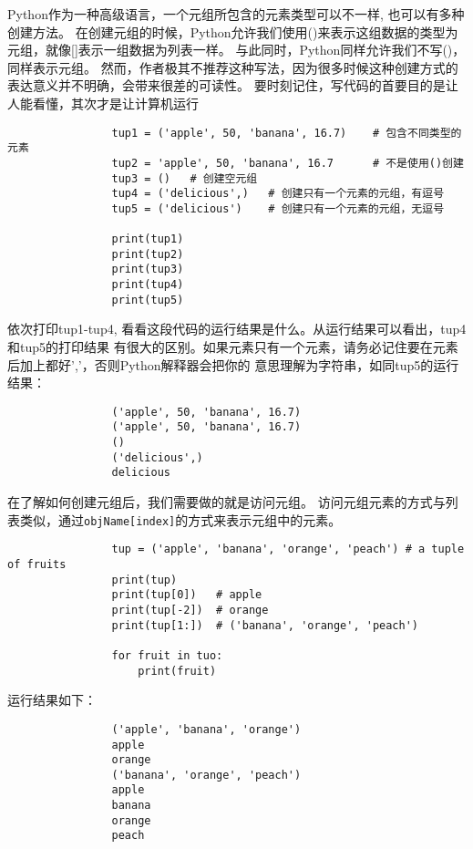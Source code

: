\documentclass[12pt]{article}
\begin{document}
            Python作为一种高级语言，一个元组所包含的元素类型可以不一样, 也可以有多种创建方法。
            在创建元组的时候，Python允许我们使用()来表示这组数据的类型为元组，就像[]表示一组数据为列表一样。
            与此同时，Python同样允许我们不写()，同样表示元组。
            然而，作者极其不推荐这种写法，因为很多时候这种创建方式的表达意义并不明确，会带来很差的可读性。
            要时刻记住，写代码的首要目的是让人能看懂，其次才是让计算机运行
            \begin{lstlisting}
                tup1 = ('apple', 50, 'banana', 16.7)    # 包含不同类型的元素
                tup2 = 'apple', 50, 'banana', 16.7      # 不是使用()创建
                tup3 = ()   # 创建空元组
                tup4 = ('delicious',)   # 创建只有一个元素的元组，有逗号
                tup5 = ('delicious')    # 创建只有一个元素的元组，无逗号

                print(tup1)
                print(tup2)
                print(tup3)
                print(tup4)
                print(tup5)
            \end{lstlisting}

            依次打印tup1-tup4, 看看这段代码的运行结果是什么。从运行结果可以看出，tup4和tup5的打印结果
            有很大的区别。如果元素只有一个元素，请务必记住要在元素后加上都好','，否则Python解释器会把你的
            意思理解为字符串，如同tup5的运行结果：
            \begin{lstlisting}
                ('apple', 50, 'banana', 16.7)
                ('apple', 50, 'banana', 16.7)
                ()
                ('delicious',)
                delicious
            \end{lstlisting}

            在了解如何创建元组后，我们需要做的就是访问元组。
            访问元组元素的方式与列表类似，通过\lstinline{objName[index]}的方式来表示元组中的元素。
            \begin{lstlisting}
                tup = ('apple', 'banana', 'orange', 'peach') # a tuple of fruits
                print(tup)
                print(tup[0])   # apple
                print(tup[-2])  # orange
                print(tup[1:])  # ('banana', 'orange', 'peach')

                for fruit in tuo:
                    print(fruit)
            \end{lstlisting}
            运行结果如下：
            \begin{lstlisting}
                ('apple', 'banana', 'orange')
                apple
                orange
                ('banana', 'orange', 'peach')
                apple
                banana
                orange
                peach
            \end{lstlisting}
\end{document}
